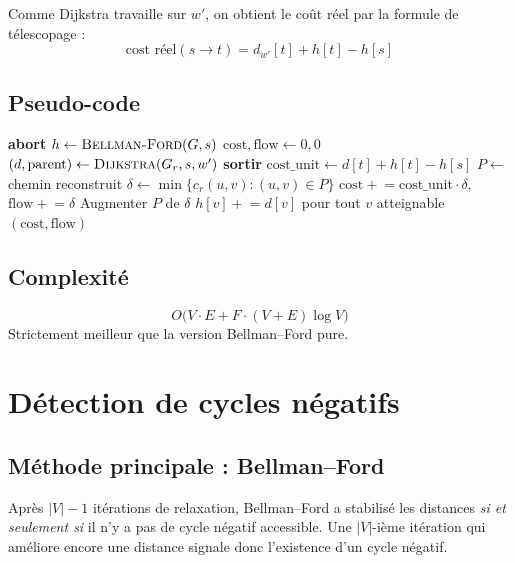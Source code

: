 \documentclass[11pt,a4paper]{article}
\newcommand{\Gres}{G_{r}}
\begin{document}
Comme Dijkstra travaille sur $w'$, on obtient le coût réel par la formule
de télescopage :
\[
    \boxed{\;\text{cost réel}(s \to t) = d_{w'}[t] + h[t] - h[s]\;}
\]

\subsection{Pseudo-code}

\begin{algorithm}[H]
\caption{MCF par Dijkstra + reweighting de Johnson}
\begin{algorithmic}[1]
     \textbf{abort} \EndIf
    \State $h \gets \Call{Bellman-Ford}{G, s}$ 
    \State $\text{cost}, \text{flow} \gets 0, 0$
        \State $(d, \text{parent}) \gets \Call{Dijkstra}{\Gres, s, w'}$
         \textbf{sortir} \EndIf
        \State $\text{cost\_unit} \gets d[t] + h[t] - h[s]$
        \State $P \gets$ chemin reconstruit
        \State $\delta \gets \min\{c_r(u,v) : (u,v) \in P\}$
        \State $\text{cost} \mathrel{+}= \text{cost\_unit} \cdot \delta$, \quad $\text{flow} \mathrel{+}= \delta$
        \State Augmenter $P$ de $\delta$
        \State $h[v] \mathrel{+}= d[v]$ pour tout $v$ atteignable
    \EndWhile
    \State \Return $(\text{cost}, \text{flow})$
\EndFunction
\end{algorithmic}
\end{algorithm}

\subsection{Complexité}

\[
\boxed{\;O\bigl(V \cdot E + F \cdot (V + E) \log V\bigr)\;}
\]
Strictement meilleur que la version Bellman--Ford pure.

\section{Détection de cycles négatifs}
\label{sec:neg-cycle}

\subsection{Méthode principale : Bellman--Ford}

Après $|V|-1$ itérations de relaxation, Bellman--Ford a stabilisé les
distances \emph{si et seulement si} il n'y a pas de cycle négatif
accessible. Une $|V|$-ième itération qui améliore encore une distance
signale donc l'existence d'un cycle négatif.
\end{document}
